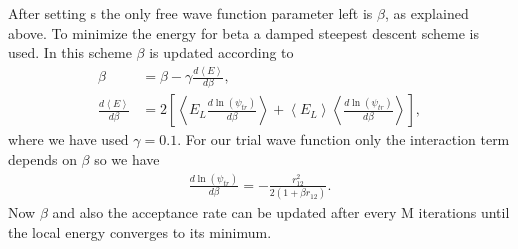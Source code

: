 After setting s the only free wave function parameter left is $\beta$, as explained above. To minimize the energy for beta a damped steepest descent scheme is used. In this scheme $\beta$ is updated according to
\begin{align}
\beta  &= \beta  - \gamma \frac{{d\left\langle E \right\rangle }}{{d\beta }},\\
\frac{{d\left\langle E \right\rangle }}{{d\beta }} &= 2\left[ {\left\langle {{E_L}\frac{{d\ln ({\psi _{tr}})}}{{d\beta }}} \right\rangle  + \left\langle {{E_L}} \right\rangle \left\langle {\frac{{d\ln ({\psi _{tr}})}}{{d\beta }}} \right\rangle } \right],
\end{align}
where we have used $\gamma=0.1$. For our trial wave function only the interaction term depends on $\beta$ so we have
\begin{align}
\frac{{d\ln ({\psi _{tr}})}}{{d\beta }} =  - \frac{{r_{12}^2}}{{2(1 + \beta {r_{12}})}}.
\end{align}
Now $\beta$ and also the acceptance rate can be updated after every M iterations until the local energy converges to its minimum.	
